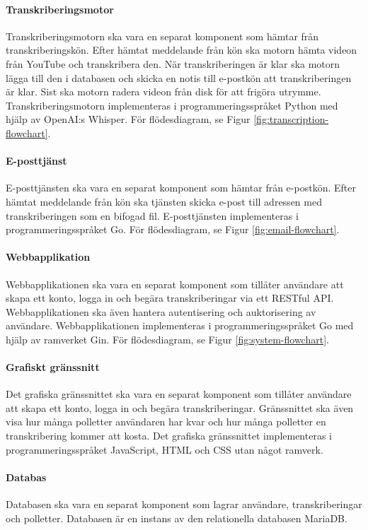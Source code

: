 \paragraph{Transkriberingsmotor}
Transkriberingsmotorn ska vara en separat komponent som hämtar från
transkriberingskön. Efter hämtat meddelande från kön ska motorn hämta videon
från YouTube och transkribera den. När transkriberingen är klar ska motorn
lägga till den i databasen och skicka en notis till e-postkön att
transkriberingen är klar. Sist ska motorn radera videon från disk för att
frigöra utrymme. Transkriberingsmotorn implementeras i programmeringsspråket
Python med hjälp av OpenAI:s Whisper. För flödesdiagram, se Figur \ref{fig:transcription-flowchart}.

\paragraph{E-posttjänst}
E-posttjänsten ska vara en separat komponent som hämtar från e-postkön. Efter
hämtat meddelande från kön ska tjänsten skicka e-post till adressen med
transkriberingen som en bifogad fil. E-posttjänsten implementeras i 
programmeringsspråket Go. För flödesdiagram, se Figur \ref{fig:email-flowchart}.

\paragraph{Webbapplikation}
Webbapplikationen ska vara en separat komponent som tillåter användare att skapa ett
konto, logga in och begära transkriberingar via ett RESTful API. Webbapplikationen ska
även hantera autentisering och auktorisering av användare. Webbapplikationen implementeras
i programmeringsspråket Go med hjälp av ramverket Gin. För flödesdiagram, se Figur \ref{fig:system-flowchart}.

\paragraph{Grafiskt gränssnitt}
Det grafiska gränssnittet ska vara en separat komponent som tillåter användare
att skapa ett konto, logga in och begära transkriberingar. Gränssnittet ska även
visa hur många polletter användaren har kvar och hur många polletter en transkribering
kommer att kosta. Det grafiska gränssnittet implementeras i programmeringsspråket
JavaScript, HTML och CSS utan något ramverk.

\paragraph{Databas}
Databasen ska vara en separat komponent som lagrar användare, transkriberingar
och polletter. Databasen är en instans av den relationella databasen MariaDB.

